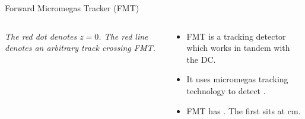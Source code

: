 \begin{frame}{Forward Micromegas Tracker (FMT)}
    \label{10.34::fmt}

    \begin{columns}[onlytextwidth,T]

    \begin{column}{.50\linewidth}
        \vspace{-12pt}
        \begin{figure}[t]
        \end{figure}
        \vspace{-21pt}
        \scriptsize{\textit{
            The red dot denotes $z=0$.
            The red line denotes an arbitrary track crossing FMT.
        }}

    \end{column}

    \begin{column}{.48\linewidth}
        \vspace{24pt}
        \begin{itemize}
            \item
                FMT is a tracking detector which works in tandem with the DC.

            \vspace{12pt}
            \item
                It uses micromegas tracking technology to detect .

            \vspace{12pt}
            \item
                FMT has .
                The first sits at  \textcolor{efd_green}{cm}.
        \end{itemize}
    \end{column}

    \end{columns}
\end{frame}
